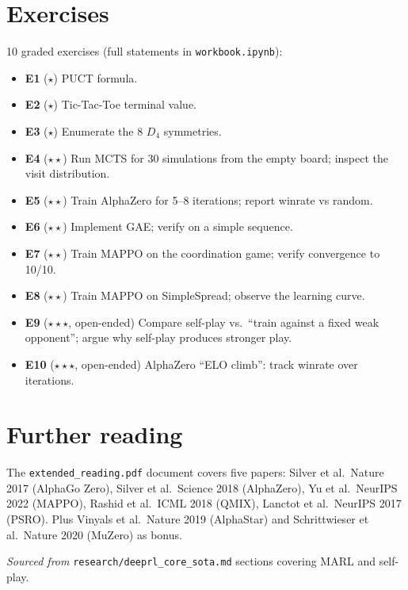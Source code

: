 \documentclass[11pt,oneside]{scrbook}
\begin{document}
\chapter{Exercises}

10 graded exercises (full statements in \texttt{workbook.ipynb}):

\begin{itemize}\setlength\itemsep{2pt}
  \item \textbf{E1} ($\star$) PUCT formula.
  \item \textbf{E2} ($\star$) Tic-Tac-Toe terminal value.
  \item \textbf{E3} ($\star$) Enumerate the 8 $D_4$ symmetries.
  \item \textbf{E4} ($\star\star$) Run MCTS for 30 simulations from the
        empty board; inspect the visit distribution.
  \item \textbf{E5} ($\star\star$) Train AlphaZero for 5--8 iterations; report
        winrate vs random.
  \item \textbf{E6} ($\star\star$) Implement GAE; verify on a simple sequence.
  \item \textbf{E7} ($\star\star$) Train MAPPO on the coordination game; verify
        convergence to 10/10.
  \item \textbf{E8} ($\star\star$) Train MAPPO on SimpleSpread; observe the
        learning curve.
  \item \textbf{E9} ($\star\star\star$, open-ended) Compare self-play
        vs.\ ``train against a fixed weak opponent''; argue why self-play
        produces stronger play.
  \item \textbf{E10} ($\star\star\star$, open-ended) AlphaZero ``ELO
        climb'': track winrate over iterations.
\end{itemize}

\chapter{Further reading}

The \texttt{extended\_reading.pdf} document covers five papers: Silver
et al.\ Nature 2017 (AlphaGo Zero), Silver et al.\ Science 2018
(AlphaZero), Yu et al.\ NeurIPS 2022 (MAPPO), Rashid et al.\ ICML 2018
(QMIX), Lanctot et al.\ NeurIPS 2017 (PSRO). Plus Vinyals et al.\ Nature
2019 (AlphaStar) and Schrittwieser et al.\ Nature 2020 (MuZero) as
bonus.

\emph{Sourced from} \texttt{research/deeprl\_core\_sota.md} sections
covering MARL and self-play.
\end{document}
